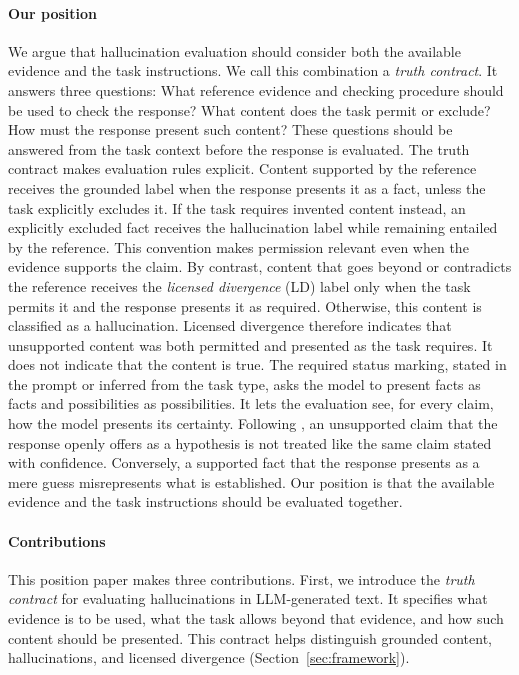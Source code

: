 \documentclass{clv2025}
\newcommand{\LD}{\textsc{LD}}
\begin{document}
\paragraph{Our position}
We argue that hallucination evaluation should consider both the available
evidence and the task instructions. We call this combination a \emph{truth
contract}. It answers three questions: What reference evidence and checking procedure should be used to check the response? What content does the task permit or exclude? How must the response present such content?
These questions should be answered from the task context
before the response is evaluated.
The truth contract makes evaluation rules explicit. Content supported by
the reference receives the grounded label when the response presents it as
a fact, unless the task explicitly excludes it.
If the task requires invented content instead, an explicitly excluded fact
receives the hallucination label while remaining entailed by the reference.
This convention makes permission relevant even when the evidence supports
the claim.
By contrast, content that goes beyond or contradicts the reference receives the \emph{licensed divergence} (\LD) label only when the task permits it and the response presents it as required.
Otherwise, this content is classified as a
hallucination. Licensed divergence therefore indicates
that unsupported content was both permitted and presented as the task
requires. It does not indicate that the content is true.
The required status marking, stated in the prompt or inferred from the
task type, asks the model to present facts as facts and possibilities as
possibilities. It lets the evaluation see, for every claim, how the model
presents its certainty. Following \citet{yona_metacognition_2026}, an
unsupported claim that the response openly offers as a hypothesis is not
treated like the same claim stated with confidence. Conversely, a supported
fact that the response presents as a mere guess misrepresents what is
established. Our position is that
the available evidence and the task instructions should be evaluated
together.

\paragraph{Contributions}
This position paper makes three contributions. First, we introduce the
\emph{truth contract} for evaluating hallucinations in LLM-generated text. It specifies what evidence is to be used, what the task
allows beyond that evidence, and how such content should be presented. This
contract helps distinguish grounded content, hallucinations, and licensed
divergence (Section~\ref{sec:framework}).
\end{document}

